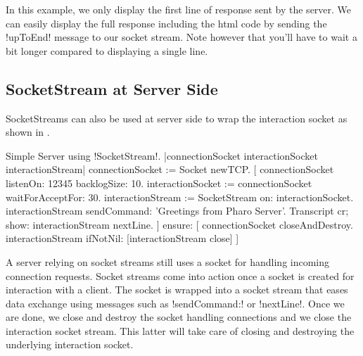 \documentclass[a4paper,10pt,twoside]{book}
\begin{document}
In this example, we only display the first line of response sent by the server.
We can easily display the full response including the html code by sending the \ct!upToEnd! message to our socket stream.
Note however that you'll have to wait a bit longer compared to displaying a single line.

\subsection{SocketStream at Server Side}
SocketStreams can also be used at server side to wrap the interaction socket as shown in .

\begin{script}{Simple Server using \ct!SocketStream!.}
|connectionSocket interactionSocket interactionStream|
connectionSocket := Socket newTCP. 
[
	connectionSocket listenOn: 12345 backlogSize: 10. 
	interactionSocket := connectionSocket waitForAcceptFor: 30. 
	interactionStream := SocketStream on: interactionSocket.
	interactionStream sendCommand: 'Greetings from Pharo Server'.
	Transcript cr; show: interactionStream nextLine.
] ensure: [
	connectionSocket closeAndDestroy.
	interactionStream ifNotNil: [interactionStream close]
]
\end{script}

A server relying on socket streams still uses a socket for handling incoming connection requests.
Socket streams come into action once a socket is created for interaction with a client.
The socket is wrapped into a socket stream that eases data exchange using messages such as \ct!sendCommand:! or \ct!nextLine!.
Once we are done, we close and destroy the socket handling connections and we close the interaction socket stream.
This latter will take care of closing and destroying the underlying interaction socket.

\end{document}
